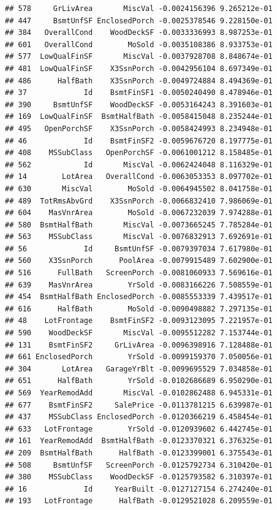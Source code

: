 \documentclass[american,]{article}
\theoremstyle{definition}
\theoremstyle{definition}
\theoremstyle{definition}
\theoremstyle{remark}
\begin{document}
\begin{verbatim}
## 578     GrLivArea       MiscVal -0.0024156396 9.265212e-01
## 447     BsmtUnfSF EnclosedPorch -0.0025378546 9.228150e-01
## 384   OverallCond    WoodDeckSF -0.0033336993 8.987253e-01
## 601   OverallCond        MoSold -0.0035108386 8.933753e-01
## 577  LowQualFinSF       MiscVal -0.0037928708 8.848674e-01
## 481  LowQualFinSF    X3SsnPorch -0.0042956104 8.697349e-01
## 486      HalfBath    X3SsnPorch -0.0049724884 8.494369e-01
## 37             Id    BsmtFinSF1 -0.0050240490 8.478946e-01
## 390     BsmtUnfSF    WoodDeckSF -0.0053164243 8.391603e-01
## 169  LowQualFinSF  BsmtHalfBath -0.0058415048 8.235244e-01
## 495   OpenPorchSF    X3SsnPorch -0.0058424993 8.234948e-01
## 46             Id    BsmtFinSF2 -0.0059676720 8.197775e-01
## 408    MSSubClass   OpenPorchSF -0.0061001212 8.158485e-01
## 562            Id       MiscVal -0.0062424048 8.116329e-01
## 14        LotArea   OverallCond -0.0063053353 8.097702e-01
## 630       MiscVal        MoSold -0.0064945502 8.041758e-01
## 489  TotRmsAbvGrd    X3SsnPorch -0.0066832410 7.986069e-01
## 604    MasVnrArea        MoSold -0.0067232039 7.974288e-01
## 580  BsmtHalfBath       MiscVal -0.0073665245 7.785284e-01
## 563    MSSubClass       MiscVal -0.0076832913 7.692691e-01
## 56             Id     BsmtUnfSF -0.0079397034 7.617980e-01
## 560    X3SsnPorch      PoolArea -0.0079915489 7.602900e-01
## 516      FullBath   ScreenPorch -0.0081060933 7.569616e-01
## 639    MasVnrArea        YrSold -0.0083166226 7.508559e-01
## 454  BsmtHalfBath EnclosedPorch -0.0085553339 7.439517e-01
## 616      HalfBath        MoSold -0.0090498882 7.297135e-01
## 48    LotFrontage    BsmtFinSF2 -0.0093123095 7.221957e-01
## 590    WoodDeckSF       MiscVal -0.0095512282 7.153744e-01
## 131    BsmtFinSF2     GrLivArea -0.0096398916 7.128488e-01
## 661 EnclosedPorch        YrSold -0.0099159370 7.050056e-01
## 304       LotArea   GarageYrBlt -0.0099695529 7.034858e-01
## 651      HalfBath        YrSold -0.0102686689 6.950290e-01
## 569  YearRemodAdd       MiscVal -0.0102862488 6.945331e-01
## 677    BsmtFinSF2     SalePrice -0.0113781215 6.639987e-01
## 437    MSSubClass EnclosedPorch -0.0120366219 6.458454e-01
## 633   LotFrontage        YrSold -0.0120939602 6.442745e-01
## 161  YearRemodAdd  BsmtHalfBath -0.0123370321 6.376325e-01
## 209  BsmtHalfBath      HalfBath -0.0123399001 6.375543e-01
## 508     BsmtUnfSF   ScreenPorch -0.0125792734 6.310420e-01
## 380    MSSubClass    WoodDeckSF -0.0125793582 6.310397e-01
## 16             Id     YearBuilt -0.0127127154 6.274240e-01
## 193   LotFrontage      HalfBath -0.0129521028 6.209559e-01

\end{verbatim}
\end{document}
